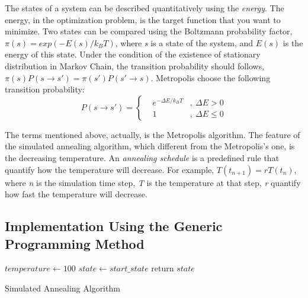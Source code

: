 \documentclass[10.5pt,a4paper]{article}
\begin{document}
The states of a system can be described quantitatively using the \textit{energy}. The energy, in the optimization problem, is the target function that you want to minimize. Two states can be compared using the Boltzmann probability factor, $\pi(s)=exp(-E(s)/k_BT)$\cite{1}, where \textit{s} is a state of the system, and $E(s)$ is the energy of this state. Under the condition of the existence of stationary distribution in Markov Chain, the transition probability should follows, $\pi(s)P(s\rightarrow s') = \pi(s')P(s'\rightarrow s)$. Metropolis choose the following transition probability:
\begin{equation}
P(s\rightarrow s')=\left\lbrace 
\begin{aligned}
&e^{-\Delta E/k_BT}&,\ \Delta E>0\\
&1&,\ \Delta E\leqslant 0
\end{aligned}\right. 
\end{equation}

The terms mentioned above, actually, is the Metropolis algorithm. The feature of the simulated annealing algorithm, which different from the Metropolis's one, is the decreasing temperature. An \textit{annealing schedule} is a predefined rule that quantify how the temperature will decrease. For example, $T(t_{n+1})=rT(t_n)$, where \textit{n} is the simulation time step, \textit{T} is the temperature at that step, \textit{r} quantify how fast the temperature will decrease.
\subsection{Implementation Using the Generic Programming Method}
\begin{algorithm}[H]
$temperature \gets 100$\;
$state \gets start\_state$\;
\For{$t \gets 0$ \KwTo $max\_iteration$}{
	$energy_1 \gets$ current $stage$ energy\;
	$state\_tmp \gets$ a neighbour of the $state$\;
	$energy_2 \gets$ $stage\_tmp$ energy\;
	$transition\_probability \gets e^{-\Delta E/k_BT}$\;
	$p \gets$random number generator[0,1)\;
	\If{$p<transition\_probability$}{
		$state \gets state\_tmp$\;
	}
	\Else{
		drop $state\_tmp$\;
	}
	$temperature \gets temperature*r$\;
}
return $state$\;
\caption{Simulated Annealing Algorithm}
\end{algorithm}
\end{document}
